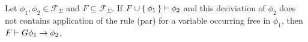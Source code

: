 \begin{theorem}
  Let $\phi_1, \phi_2 \in \mathcal{F}_\Sigma$ and $F \subseteq \mathcal{F}_\Sigma$. If $F \cup \set{\phi_1} \vdash \phi_2$ and this deriviation of $\phi_2$ does not contains application of the rule (par) for a variable occurring free in $\phi_1$, then $F \vdash G{\phi_1} \to \phi_2$.
\end{theorem}

